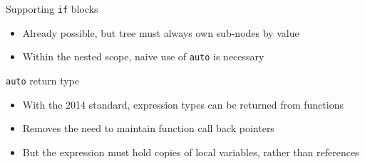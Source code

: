 \documentclass[xcolor=dvipsnames]{beamer}
\begin{document}
\begin{frame}[fragile]{Supporting \texttt{if} blocks}
\begin{itemize}
\item Already possible, but tree must always own sub-nodes by value \vspace{5mm}
\item Within the nested scope, naive use of \texttt{auto} is necessary \vspace{5mm}
\end{itemize}
\end{frame}


\begin{frame}[fragile]{\texttt{auto} return type}
\begin{itemize}
\item With the 2014 standard, expression types can be returned from functions \vspace{5mm}
\item Removes the need to maintain function call back pointers \vspace{5mm}
\item But the expression must hold copies of local variables, rather than references \vspace{5mm}
\end{itemize}
\end{frame}
\end{document}
